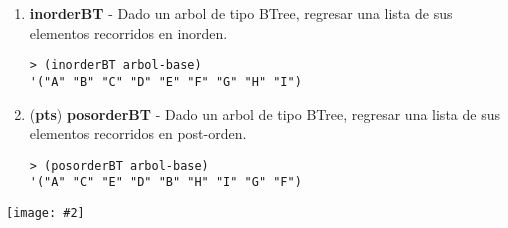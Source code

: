 \documentclass{article}
\newcommand{\grade}[1]{(\textbf{#1pts}) }
\newcommand{\jimage}[2]{\texttt{[image: \#2]}\vskip10pt}
\begin{document}
\begin{itemize}
\begin{enumerate}
\item  \textbf{inorderBT}  - Dado un arbol de tipo BTree, regresar una lista de sus elementos recorridos en inorden.
\begin{verbatim}
> (inorderBT arbol-base)
'("A" "B" "C" "D" "E" "F" "G" "H" "I")
\end{verbatim}

\item \grade {} \textbf{posorderBT} - Dado un arbol de tipo BTree, regresar una lista de sus elementos recorridos en post-orden.
\begin{verbatim}
> (posorderBT arbol-base)
'("A" "C" "E" "D" "B" "H" "I" "G" "F")
\end{verbatim}
   
\end{enumerate}

\jimage{0.8}{imgs/orders.png}
\end{itemize}

\end{document}
